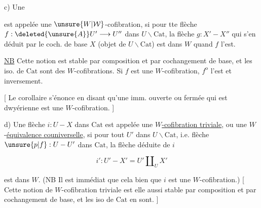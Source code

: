 c) Une  

est appelée une $\unsure{W|\mathcal W}$-cofibration, si pour tte flèche $f:\deleted{\unsure{A}}U'\longrightarrow U''$ dans $U\backslash\mathrm{Cat}$, la flèche $g:X'\mathbin{-}X''$ qui s'en déduit par le coch. de base  $X$ (objet de $U\backslash\mathrm{Cat}$) est dans $W$ quand $f$ l'est.

\uline{NB} Cette notion  est stable par composition et par cochangement de base, et les iso. de $\mathrm{Cat}$ sont des $W$-cofibrations. Si $f$ est une $W$-cofibration, $f^{\mathrm o}$ l'est et inversement.

[ Le corollaire s'énonce en disant qu'une imm. ouverte ou fermée qui est dwyérienne est une $W$-cofibration. ]

d) Une flèche $i:U\mathbin{-}X$ dans $\mathrm{Cat}$ est appelée une \uline{$W$-cofibration triviale}, ou une $W$-\uline{équivalence couniverselle}, si pour tout $U'$ dans $U\backslash\mathrm{Cat}$, i.e.  flèche $\unsure{p|f}:U\mathbin{-}U'$ dans $\mathrm{Cat}$, la flèche déduite de $i$

\[
i':U'\mathbin{-}X'=U'\amalg_{U}X'
\]

est dans $W$. (NB Il est immédiat que cela  bien que $i$ est une $W$-cofibration.) [ Cette notion de $W$-cofibration triviale est elle aussi stable par composition et par cochangement de base, et les iso de $\mathrm{Cat}$ en sont. ]
